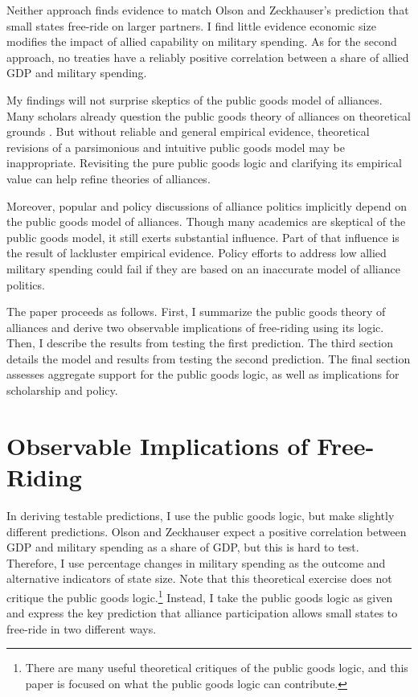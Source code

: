 \documentclass[12pt]{article}
\begin{document}
Neither approach finds evidence to match Olson and Zeckhauser's prediction that small states free-ride on larger partners. 
I find little evidence economic size modifies the impact of allied capability on military spending.
As for the second approach, no treaties have a reliably positive correlation between a share of allied GDP and military spending. 


My findings will not surprise skeptics of the public goods model of alliances. 
Many scholars already question the public goods theory of alliances on theoretical grounds \citep{Palmer1990, SandlerHartley2001, Norrlof2010}. 
But without reliable and general empirical evidence, theoretical revisions of a parsimonious and intuitive public goods model may be inappropriate.
Revisiting the pure public goods logic and clarifying its empirical value can help refine theories of alliances. 


Moreover, popular and policy discussions of alliance politics implicitly depend on the public goods model of alliances. 
Though many academics are skeptical of the public goods model, it still exerts substantial influence. 
Part of that influence is the result of lackluster empirical evidence. 
Policy efforts to address low allied military spending could fail if they are based on an inaccurate model of alliance politics. 


The paper proceeds as follows.
First, I summarize the public goods theory of alliances and derive two observable implications of free-riding using its logic.
Then, I describe the results from testing the first prediction.
The third section details the model and results from testing the second prediction. 
The final section assesses aggregate support for the public goods logic, as well as implications for scholarship and policy. 



\section{Observable Implications of Free-Riding}

In deriving testable predictions, I use the public goods logic, but make slightly different predictions.
Olson and Zeckhauser expect a positive correlation between GDP and military spending as a share of GDP, but this is hard to test. 
Therefore, I use percentage changes in military spending as the outcome and alternative indicators of state size. 
Note that this theoretical exercise does not critique the public goods logic.\footnote{There are many useful theoretical critiques of the public goods logic, and this paper is focused on what the public goods logic can contribute.} 
Instead, I take the public goods logic as given and express the key prediction that alliance participation allows small states to free-ride in two different ways. 
\end{document}
